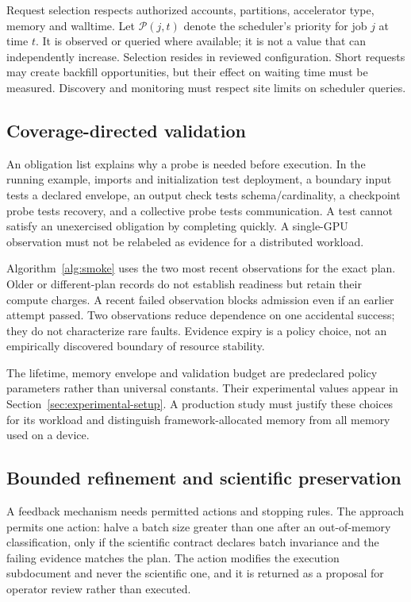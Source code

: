 Request selection respects authorized accounts, partitions, accelerator type, memory and walltime. Let $\mathcal{P}(j,t)$ denote the scheduler's priority for job $j$ at time $t$. It is observed or queried where available; it is not a value that \tool{} can independently increase. Selection resides in reviewed configuration. Short requests may create backfill opportunities, but their effect on waiting time must be measured. Discovery and monitoring must respect site limits on scheduler queries.

\subsection{Coverage-directed validation}
An obligation list explains why a probe is needed before execution. In the running example, imports and initialization test deployment, a boundary input tests a declared envelope, an output check tests schema/cardinality, a checkpoint probe tests recovery, and a collective probe tests communication. A test cannot satisfy an unexercised obligation by completing quickly. A single-GPU observation must not be relabeled as evidence for a distributed workload.

Algorithm~\ref{alg:smoke} uses the two most recent observations for the exact plan. Older or different-plan records do not establish readiness but retain their compute charges. A recent failed observation blocks admission even if an earlier attempt passed. Two observations reduce dependence on one accidental success; they do not characterize rare faults. Evidence expiry is a policy choice, not an empirically discovered boundary of resource stability.

The lifetime, memory envelope and validation budget are predeclared policy parameters rather than universal constants. Their experimental values appear in Section~\ref{sec:experimental-setup}. A production study must justify these choices for its workload and distinguish framework-allocated memory from all memory used on a device.

\subsection{Bounded refinement and scientific preservation}
A feedback mechanism needs permitted actions and stopping rules. The approach permits one action: halve a batch size greater than one after an out-of-memory classification, only if the scientific contract declares batch invariance and the failing evidence matches the plan. The action modifies the execution subdocument and never the scientific one, and it is returned as a proposal for operator review rather than executed.

